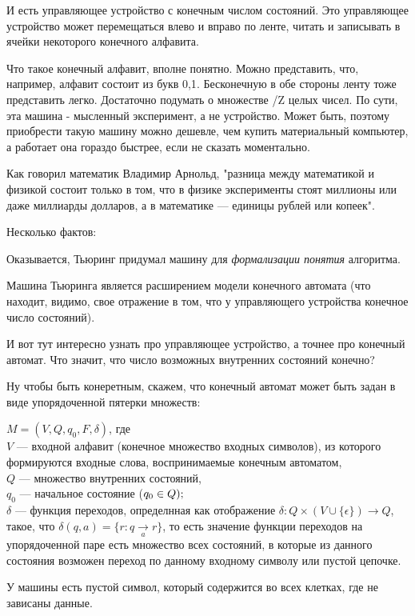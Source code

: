 \documentclass{article}
\begin{document}
И есть управляющее устройство с конечным числом состояний. 
Это управляющее устройство может перемещаться влево и вправо по ленте, читать и записывать в ячейки некоторого конечного алфавита.

Что такое конечный алфавит, вполне понятно. Можно представить, что, например, алфавит состоит из букв {0,1}. 
Бесконечную в обе стороны ленту тоже представить легко. Достаточно подумать о множестве /Z целых чисел.
По сути, эта машина - мысленный эксперимент, а не устройство. 
Может быть, поэтому приобрести такую машину можно дешевле, чем купить материальный компьютер, а работает она гораздо быстрее, если не сказать моментально.

Как говорил математик Владимир Арнольд, "разница между математикой и физикой состоит только в том, что в физике эксперименты стоят миллионы или даже миллиарды долларов, а в математике — единицы рублей или копеек".

Несколько фактов:

Оказывается, Тьюринг придумал машину для \textit{формализации понятия} алгоритма.

Машина Тьюринга является расширением модели конечного автомата (что находит, видимо, свое отражение в том, что у управляющего устройства конечное число состояний).

И вот тут интересно узнать про управляющее устройство, а точнее про конечный автомат. Что значит, что число возможных внутренних состояний конечно?

Ну чтобы быть конеретным, скажем, что конечный автомат может быть задан в виде упорядоченной пятерки множеств:

$M = (V, Q, q_0, F, \delta)$, где\\
$V$ --- входной алфавит (конечное множество входных символов), из которого формируются входные слова, воспринимаемые конечным автоматом,\\
$Q$ --- множество внутренних состояний,\\
$q_0$ --- начальное состояние ($q_0 \in Q);\\
$\\
$\delta$ --- функция переходов, определнная как отображение $\delta:Q\times(V\cup\{\epsilon\})\to Q$, такое, что $\delta(q,a)=\{r:q\underset{a}{\to} r\}$, то есть значение функции переходов на упорядоченной паре есть множество всех состояний, в которые из данного состояния возможен переход по данному входному символу или пустой цепочке.

У машины есть пустой символ, который содержится во всех клетках, где не зависаны данные.
\end{document}
